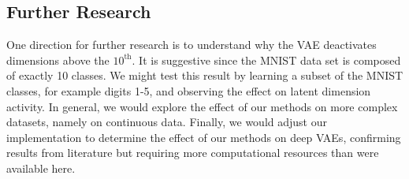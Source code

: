 \documentclass{article} %
\numberwithin{figure}{section}
\begin{document}
\subsection{Further Research}
One direction for further research is to understand why the VAE deactivates dimensions above the $10^{\text{th}}$. It is suggestive since the MNIST data set is composed of exactly 10 classes. We might test this result by learning a subset of the MNIST classes, for example digits 1-5, and observing the effect on latent dimension activity. In general, we would explore the effect of our methods on more complex datasets, namely on continuous data. Finally, we would adjust our implementation to determine the effect of our methods on deep VAEs, confirming results from literature but  requiring more computational resources than were available here.



\end{document}
